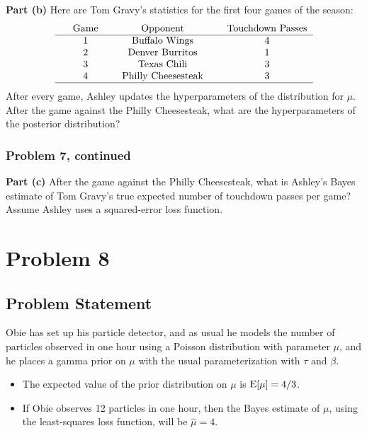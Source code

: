 \documentclass[12pt]{article}
\theoremstyle{definition}
\begin{document}
\vspace{2in}
\noindent
{\bf Part (b)} Here are Tom Gravy's statistics for the first four games of the season:
$$
\begin{tabular}{ccccccc}
& Game & & Opponent & & Touchdown Passes\\
\hline
& 1 & & Buffalo Wings & & 4\\
& 2 & & Denver Burritos & & 1\\
& 3 & & Texas Chili & & 3\\
& 4 & & Philly Cheesesteak & & 3\\
\hline
\end{tabular}
$$
After every game, Ashley updates the hyperparameters of the distribution for $\mu$. After the game against the Philly Cheesesteak, what are the hyperparameters of the posterior distribution?
 
\newpage
\subsubsection*{Problem 7, continued}

\vspace{4.5in}
\noindent
{\bf Part (c)} After the game against the Philly Cheesesteak, what is Ashley's Bayes estimate of Tom Gravy's true expected number of touchdown passes per game? Assume Ashley uses a squared-error loss function.




\newpage
\section*{Problem 8}

\subsection*{Problem Statement}

Obie has set up his particle detector, and as usual he models the number of particles observed in one hour using a Poisson distribution with parameter $\mu$, and he places a gamma prior on $\mu$ with the usual parameterization with $\tau$ and $\beta$.
\begin{itemize}
	\item The expected value of the prior distribution on $\mu$ is $\hbox{E}[\mu] = 4/3$.
	\item If Obie observes 12 particles in one hour, then the Bayes estimate of $\mu$, using the least-squares loss function, will be $\hat{\mu} = 4$.
\end{itemize}
\end{document}
